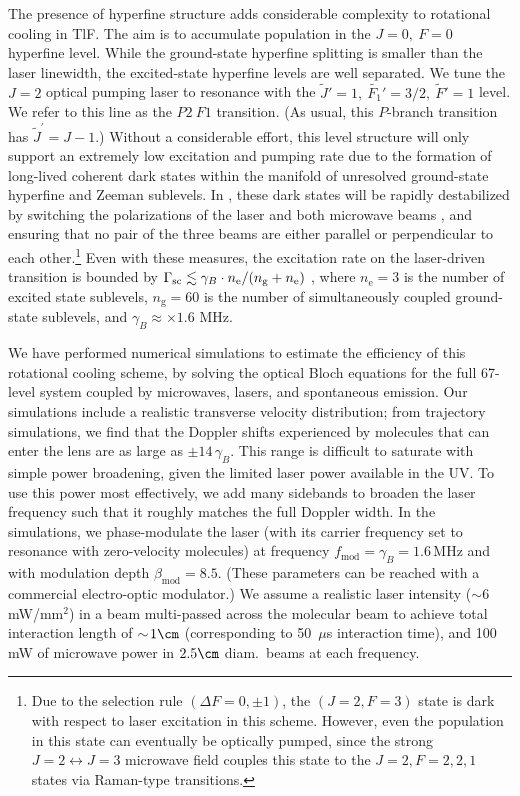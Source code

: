 The presence of hyperfine structure adds considerable complexity to rotational cooling in TlF. The aim is to accumulate population in the $J=0,~F=0$ hyperfine level. While the ground-state hyperfine splitting is smaller than the laser linewidth, the excited-state hyperfine levels are well separated. We tune the $J=2$ optical pumping laser to resonance with the   $\widetilde{J}'=1,~\widetilde{F_1}'=3/2,~\widetilde{F}'=1$ level. We refer to this line as the $P2~F1$ transition. (As usual, this $P$-branch transition has $\widetilde{J}^\prime = J-1$.) 
Without a considerable effort, this level structure will only support an extremely low excitation and pumping rate due to the formation of long-lived coherent dark states \cite{BerkelandBoshier2002} within the manifold of unresolved ground-state hyperfine and Zeeman sublevels. In \CENTREX, these dark states will be rapidly destabilized \cite{BerkelandBoshier2002} by switching the polarizations of the laser and both microwave beams \cite{ShumanRadiative,YeMicrowaveRemix}, and ensuring that no pair of the three beams are either parallel or perpendicular to each other.\footnote{Due to the selection rule $\left(\Delta F = 0,\pm1\right)$, the $\left(J=2,F=3\right)$ state is dark with respect to laser excitation in this scheme. However, even the population in this state can eventually be optically pumped, since the strong $J=2\!\leftrightarrow\!J=3$ microwave field couples this state to the $J=2,F=2,2,1$ states via Raman-type transitions.}
Even with these measures, the excitation rate on the laser-driven transition is bounded by $\Gamma_{\rm sc} \lesssim \gamma_B\cdot n_\text{e}/(n_\text{g}+n_\text{e})$ \cite{Tarbutt_2013}, where $n_\text{e}=3$ is the number of excited state sublevels, $n_\text{g} = 60$ is the number of simultaneously coupled ground-state sublevels, and $\gamma_B \approx \times 1.6 $ MHz. 


We have performed numerical simulations to estimate the efficiency of this rotational cooling scheme, by solving the optical Bloch equations for the full 67-level system coupled by microwaves, lasers, and spontaneous emission.  Our simulations include a realistic transverse velocity distribution; from trajectory simulations, we find that the Doppler shifts experienced by molecules that can enter the lens are as large as $\pm 14\,\gamma_B$. This range is difficult to saturate with simple power broadening, given the limited laser power available in the UV.  To use this power most effectively, we add many sidebands to broaden the laser frequency such that it roughly matches the full Doppler width. In the simulations, we phase-modulate the laser (with its carrier frequency set to resonance with zero-velocity molecules) at frequency $f_{\textrm{mod}}=\gamma_B = 1.6\,$MHz and with modulation depth $\beta_{\textrm{mod}}=8.5$.  (These parameters can be reached with a commercial electro-optic modulator.) We assume a realistic laser intensity ($\sim\!6$ mW/mm$^2$) in a beam multi-passed across the molecular beam to achieve total interaction length of $\sim\! 1 \cm$ (corresponding to 50~$\mu$s interaction time), and 100 mW of microwave power in $2.5 \cm$ diam.\ beams at each frequency. 

